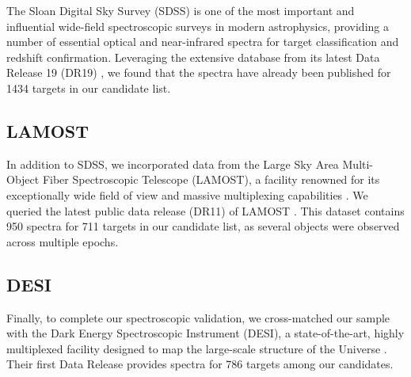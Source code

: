 The Sloan Digital Sky Survey (SDSS) is one of the most important and influential wide-field spectroscopic surveys in modern astrophysics, providing a number of essential optical and near-infrared spectra for target classification and redshift confirmation\citep{yorkSloanDigitalSky2000,kollmeierSloanDigitalSky2026}. Leveraging the extensive database from its latest Data Release 19 (DR19) \citep{collaborationNineteenthDataRelease2025}, we found that the spectra have already been published for \num{1434} targets in our candidate list.

\subsection{LAMOST}

In addition to SDSS, we incorporated data from the Large Sky Area Multi-Object Fiber Spectroscopic Telescope (LAMOST), a facility renowned for its exceptionally wide field of view and massive multiplexing capabilities \citep{zhaoLAMOSTSpectralSurvey2012,cuiLargeSkyArea2012}. We queried the latest public data release (DR11) of LAMOST \citep{lamostoperationanddevelopmentcenterLAMOSTDR11V202025}. This dataset contains \num{950} spectra for \num{711} targets in our candidate list, as several objects were observed across multiple epochs.

\subsection{DESI}

Finally, to complete our spectroscopic validation, we cross-matched our sample with the Dark Energy Spectroscopic Instrument (DESI), a state-of-the-art, highly multiplexed facility designed to map the large-scale structure of the Universe \citep{desicollaborationOverviewInstrumentationDark2022}. Their first Data Release \citep{desi_collaboration_data_2025} provides spectra for \num{786} targets among our candidates.


